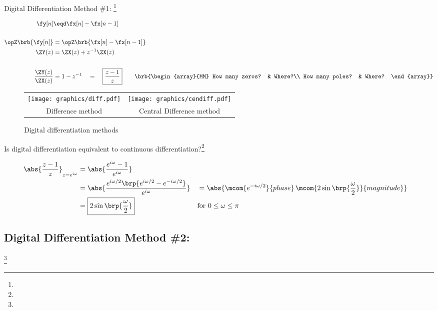 Digital Differentiation Method \#1: \footnote{}
 
\begin{align*}
  \fy[n]
    &\eqd \fx[n] - \fx[n-1]
  \\\\
  \opZ\brb{\fy[n]} &= \opZ\brb{\fx[n] - \fx[n-1]}
  \\
  \ZY(z) &= \ZX(z) + z^{-1}\ZX(z)
  \\\\
  \frac{\ZY(z)}{\ZX(z)} &= 1-z^{-1} \quad=\quad \boxed{\frac{z-1}{z}}
  \qquad\brb{\begin{array}{MM}
    How many zeros? & Where?\\
    How many poles? & Where?
  \end{array}}
\end{align*}

 
\begin{figure}[h]
  \centering
  \begin{tabular}{|c|c|}
      \hline
      \texttt{[image: graphics/diff.pdf]} & \texttt{[image: graphics/cendiff.pdf]}
    \\Difference method & Central Difference method
    \\\hline
  \end{tabular}
  \caption{Digital differentiation methods\label{fig:differentiation}}
\end{figure}

Is digital differentiation equivalent to continuous differentiation?\footnote{}
 
\begin{align*}
  \abs{\frac{z-1}{z}}_{z=e^{i\omega}}
    &= \abs{\frac{e^{i\omega}-1}
                 {e^{i\omega}}
           }
  \\&= \abs{\frac{e^{i\omega/2}\brp{e^{i\omega/2}-e^{-i\omega/2}}}
                 {e^{i\omega}}
           }
   &&= \abs{\mcom{e^{-i\omega/2}}{phase}\,\mcom{{2\sin\brp{\frac{\omega}{2}}}}{magnitude}}
  \\&= \boxed{{2\sin\brp{\frac{\omega}{2}}}} 
    && \text{for $0\le\omega\le\pi$}
\end{align*}

\subsection{Digital Differentiation Method \#2: }
\footnote{}
 
